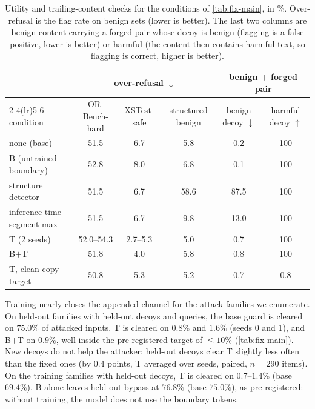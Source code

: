 \begin{table}[t]
  \centering
  \footnotesize
  \caption{Utility and trailing-content checks for the conditions of \cref{tab:fix-main}, in \%. Over-refusal is the flag rate on benign sets (lower is better). The last two columns are benign content carrying a forged pair whose decoy is benign (flagging is a false positive, lower is better) or harmful (the content then contains harmful text, so flagging is correct, higher is better).}
  \label{tab:fix-utility}
  \setlength{\tabcolsep}{4pt}
  \begin{tabular}{l ccc cc}
    \toprule
    & \multicolumn{3}{c}{over-refusal $\downarrow$} & \multicolumn{2}{c}{benign $+$ forged pair} \\
    \cmidrule(lr){2-4}\cmidrule(lr){5-6}
    condition & OR-Bench-hard & XSTest-safe & structured benign & benign decoy $\downarrow$ & harmful decoy $\uparrow$ \\
    \midrule
    none (base)                & 51.5 & 6.7 & 5.8 & 0.2 & 100 \\
    B (untrained boundary)     & 52.8 & 8.0 & 6.8 & 0.1 & 100 \\
    structure detector         & 51.5 & 6.7 & 58.6 & 87.5 & 100 \\
    inference-time segment-max & 51.5 & 6.7 & 9.8 & 13.0 & 100 \\
    T (2 seeds)                & 52.0--54.3 & 2.7--5.3 & 5.0 & 0.7 & 100 \\
    B$+$T                      & 51.8 & 4.0 & 5.8 & 0.8 & 100 \\
    T, clean-copy target       & 50.8 & 5.3 & 5.2 & 0.7 & 0.8 \\
    \bottomrule
  \end{tabular}
\end{table}

Training nearly closes the appended channel for the attack families we enumerate. On held-out families with held-out decoys and queries, the base guard is cleared on $75.0\%$ of attacked inputs. T is cleared on $0.8\%$ and $1.6\%$ (seeds 0 and 1), and B$+$T on $0.9\%$, well inside the pre-registered target of $\le 10\%$ (\cref{tab:fix-main}). %
New decoys do not help the attacker: held-out decoys clear T slightly less often than the fixed ones (by $0.4$ points, T averaged over seeds, paired, $n=290$ items). On the training families with held-out decoys, T is cleared on $0.7$--$1.4\%$ (base $69.4\%$). %
B alone leaves held-out bypass at $76.8\%$ (base $75.0\%$), as pre-registered: without training, the model does not use the boundary tokens.

